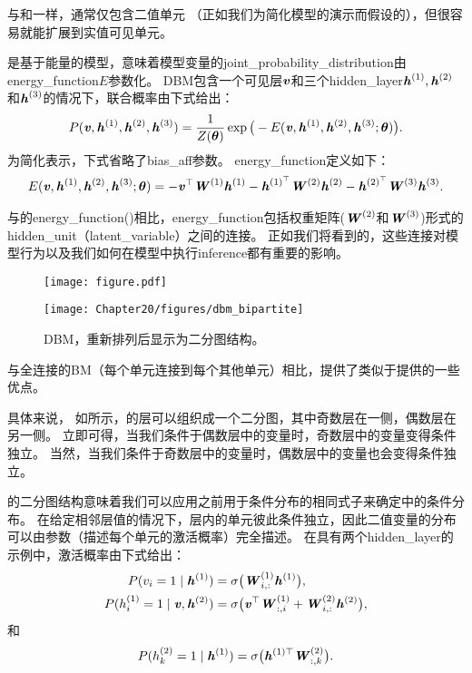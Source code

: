 与和一样，通常仅包含二值单元 （正如我们为简化模型的演示而假设的），但很容易就能扩展到实值可见单元。

是基于能量的模型，意味着模型变量的\gls{joint_probability_distribution}由\gls{energy_function}$E$参数化。
\gls{DBM}包含一个可见层$\boldsymbol{\mathit{v}}$和三个\gls{hidden_layer}$\boldsymbol{\mathit{h}}^{(1)},\boldsymbol{\mathit{h}}^{(2)}$和$\boldsymbol{\mathit{h}}^{(3)}$的情况下，联合概率由下式给出：
\begin{align}
 P(\boldsymbol{\mathit{v}}, \boldsymbol{\mathit{h}}^{(1)},  \boldsymbol{\mathit{h}}^{(2)},  \boldsymbol{\mathit{h}}^{(3)}) = \frac{1}{Z(\boldsymbol{\theta})} 
 \exp \big( -E(\boldsymbol{\mathit{v}}, \boldsymbol{\mathit{h}}^{(1)},  \boldsymbol{\mathit{h}}^{(2)},  \boldsymbol{\mathit{h}}^{(3)}; \boldsymbol{\theta}) \big).
\end{align}
为简化表示，下式省略了\gls{bias_aff}参数。
\gls{energy_function}定义如下：
\begin{align}
    E(\boldsymbol{\mathit{v}}, \boldsymbol{\mathit{h}}^{(1)}, \boldsymbol{\mathit{h}}^{(2)}, \boldsymbol{\mathit{h}}^{(3)}; \boldsymbol{\theta})  = -\boldsymbol{\mathit{v}}^\top \boldsymbol{\mathit{W}}^{(1)}\boldsymbol{\mathit{h}}^{(1)} 
 - \boldsymbol{\mathit{h}}^{(1)^\top}\boldsymbol{\mathit{W}}^{(2)}\boldsymbol{\mathit{h}}^{(2)}- \boldsymbol{\mathit{h}}^{(2)^\top}\boldsymbol{\mathit{W}}^{(3)}\boldsymbol{\mathit{h}}^{(3)}.
\end{align}

与的\gls{energy_function}()相比，\gls{energy_function}包括权重矩阵($\boldsymbol{\mathit{W}}^{(2)}$和$\boldsymbol{\mathit{W}}^{(3)}$)形式的\gls{hidden_unit}（\gls{latent_variable}）之间的连接。
正如我们将看到的，这些连接对模型行为以及我们如何在模型中执行\gls{inference}都有重要的影响。


\begin{figure}[!htb]
\ifOpenSource
\centerline{\texttt{[image: figure.pdf]}}
\else
\centerline{\texttt{[image: Chapter20/figures/dbm\_bipartite]}}
\fi
\caption{\gls{DBM}，重新排列后显示为二分图结构。}
\label{fig:chap20_dbm_bipartite}
\end{figure}

与全连接的\gls{BM}（每个单元连接到每个其他单元）相比，提供了类似于提供的一些优点。

具体来说， 如所示，的层可以组织成一个二分图，其中奇数层在一侧，偶数层在另一侧。
立即可得，当我们条件于偶数层中的变量时，奇数层中的变量变得条件独立。
当然，当我们条件于奇数层中的变量时，偶数层中的变量也会变得条件独立。

的二分图结构意味着我们可以应用之前用于条件分布的相同式子来确定中的条件分布。
在给定相邻层值的情况下，层内的单元彼此条件独立，因此二值变量的分布可以由参数（描述每个单元的激活概率）完全描述。
在具有两个\gls{hidden_layer}的示例中，激活概率由下式给出：
\begin{align}
 P(v_i=1  \mid  \boldsymbol{\mathit{h}}^{(1)}) &= \sigma \big( \boldsymbol{\mathit{W}}_{i,:}^{(1)}\boldsymbol{\mathit{h}}^{(1)} \big), \\
 P(h_i^{(1)}=1  \mid  \boldsymbol{\mathit{v}}, \boldsymbol{\mathit{h}}^{(2)}) &= \sigma \big( \boldsymbol{\mathit{v}}^\top  \boldsymbol{\mathit{W}}_{:,i}^{(1)}
 + \boldsymbol{\mathit{W}}_{i,:}^{(2)}\boldsymbol{\mathit{h}}^{(2)} \big) ,
\end{align}
和
\begin{align}
P(h_k^{(2)} =1  \mid  \boldsymbol{\mathit{h}}^{(1)}) = \sigma \big(\boldsymbol{\mathit{h}}^{(1)\top} \boldsymbol{\mathit{W}}_{:,k}^{(2)} \big).
\end{align}

